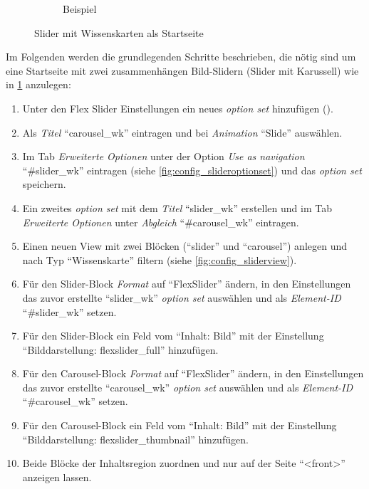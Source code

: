 \begin{figure}[H]
\begin{subfigure}[b]{0.45\textwidth}
		\caption[]{Beispiel}
		\label{fig:example_slider}
	\end{subfigure}
	\caption{Slider mit Wissenskarten als Startseite}
	\label{fig:slider}
\end{figure}

Im Folgenden werden die grundlegenden Schritte beschrieben, die nötig sind um eine Startseite mit zwei zusammenhängen Bild-Slidern (Slider mit Karussell) wie in \cref{fig:example_slider} anzulegen:
\begin{enumerate}[parsep=0pt, itemsep=5.0pt plus 2.0pt minus 1.0pt]
	\item Unter den Flex Slider Einstellungen ein neues \textit{option set} hinzufügen ().
	\item Als \textit{Titel} \enquote{carousel\_wk} eintragen und bei \textit{Animation} \enquote{Slide} auswählen.
	\item Im Tab \textit{Erweiterte Optionen} unter der Option \textit{Use as navigation} \enquote{\#slider\_wk} eintragen (siehe \cref{fig:config_slideroptionset}) und das \textit{option set} speichern.
	\item Ein zweites \textit{option set} mit dem \textit{Titel} \enquote{slider\_wk} erstellen und im Tab \textit{Erweiterte Optionen} unter \textit{Abgleich} \enquote{\#carousel\_wk} eintragen.
	\item Einen neuen View mit zwei Blöcken (\enquote{slider} und \enquote{carousel}) anlegen und nach Typ \enquote{Wissenskarte} filtern (siehe \cref{fig:config_sliderview}).
	\item Für den Slider-Block \textit{Format} auf \enquote{FlexSlider} ändern, in den Einstellungen das zuvor erstellte \enquote{slider\_wk} \textit{option set} auswählen und als \textit{Element-ID} \enquote{\#slider\_wk} setzen.
	\item Für den Slider-Block ein Feld vom \enquote{Inhalt: Bild} mit der Einstellung \enquote{Bilddarstellung: flexslider\_full} hinzufügen.
	\item Für den Carousel-Block \textit{Format} auf \enquote{FlexSlider} ändern, in den Einstellungen das zuvor erstellte \enquote{carousel\_wk} \textit{option set} auswählen und als \textit{Element-ID} \enquote{\#carousel\_wk} setzen.
	\item Für den Carousel-Block ein Feld vom \enquote{Inhalt: Bild} mit der Einstellung \enquote{Bilddarstellung: flexslider\_thumbnail} hinzufügen.
	\item Beide Blöcke der Inhaltsregion zuordnen und nur auf der Seite \enquote{<front>} anzeigen lassen.
\end{enumerate}


